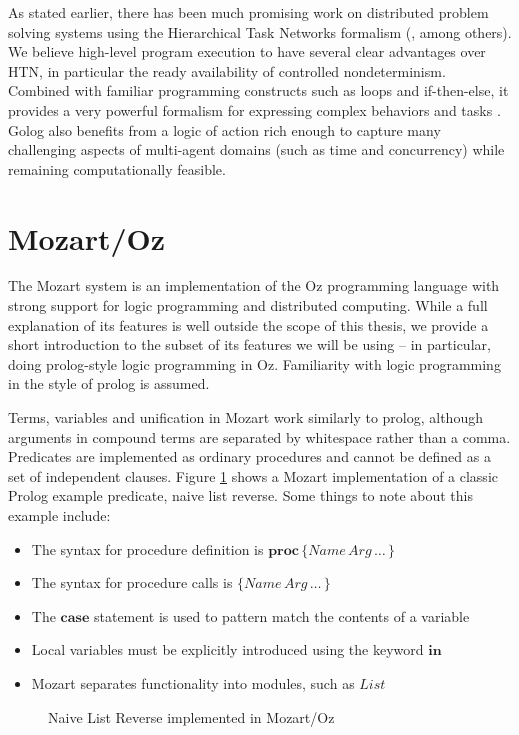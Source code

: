 As stated earlier, there has been much promising work on distributed
problem solving systems using the Hierarchical Task Networks formalism
(\citet{tambe97flexible_teamwork,decker95designing_coordination,grosz99planning_together},
among others). We believe high-level program execution to have several
clear advantages over HTN, in particular the ready availability of
controlled nondeterminism. Combined with familiar programming constructs
such as loops and if-then-else, it provides a very powerful formalism
for expressing complex behaviors and tasks \citet{Gabaldon02htn_in_golog,son00htn_golog}.
Golog also benefits from a logic of action rich enough to capture
many challenging aspects of multi-agent domains (such as time and
concurrency) while remaining computationally feasible.

\section{Mozart/Oz\label{sec:Background:Mozart/Oz}}

The Mozart system \citep{vanroy99mozart} is an implementation of
the Oz programming language \citep{vanRoyHaridi04ctm} with strong
support for logic programming and distributed computing. While a full
explanation of its features is well outside the scope of this thesis,
we provide a short introduction to the subset of its features we will
be using -- in particular, doing prolog-style logic programming in
Oz. Familiarity with logic programming in the style of prolog is assumed.

Terms, variables and unification in Mozart work similarly to prolog,
although arguments in compound terms are separated by whitespace rather
than a comma. Predicates are implemented as ordinary procedures and
cannot be defined as a set of independent clauses. Figure \ref{fig:Background:Naive-List-Reverse}
shows a Mozart implementation of a classic Prolog example predicate,
naive list reverse. Some things to note about this example include:

\begin{itemize}
\item The syntax for procedure definition is $\mathbf{proc}\,\{Name\, Arg\,\dots\,\}$ 
\item The syntax for procedure calls is $\{Name\, Arg\,\dots\,\}$ 
\item The $\mathbf{case}$ statement is used to pattern match the contents
of a variable 
\item Local variables must be explicitly introduced using the keyword $\mathbf{in}$ 
\item Mozart separates functionality into modules, such as $List$ 
\end{itemize}
%
\begin{figure}[t]

\caption{Naive List Reverse implemented in Mozart/Oz\label{fig:Background:Naive-List-Reverse}}

\end{figure}



